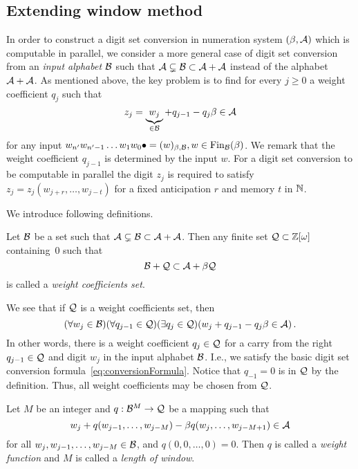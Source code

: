\begin{upravit}
\section{Extending window method}
\label{sec:methodDescription}
In order to construct a digit set conversion in numeration system $(\beta,\mathcal{A})$ which is computable in parallel, we consider a more general case of digit set conversion from an \emph{input alphabet} $\mathcal{B}$ such that $\mathcal{A} \subsetneq \mathcal{B} \subset \mathcal{A} +\mathcal{A}$ instead of the alphabet $\mathcal{A}+\mathcal{A}$.
As mentioned above, the key problem is to find for every $j\geq 0$ a weight coefficient $q_j$ such that 
    $$
        z_j=\underbrace{w_j}_{\in \mathcal{B}} + q_{j-1} - q_j \beta \in \mathcal{A} 
    $$  
    for any input $w_{n'}w_{n'-1}\dots w_1 w_0 \bullet=(w)_{\beta,\mathcal{B}}, w\in \text{Fin}_{\mathcal{B}}(\beta)$. We remark that the weight coefficient $q_{j-1}$ is determined by the input $w$. For a digit set conversion to be computable in parallel the digit $z_j$ is required to satisfy $z_j=z_j(w_{j+r},\dots,w_{j-t})$ for a fixed anticipation $r$ and memory $t$ in $\mathbb{N}$.
    
    We introduce following definitions. 
    \begin{defn}
    \label{def:weightCoefficientsSet}
        Let $\mathcal{B}$ be a set such that $\mathcal{A} \subsetneq \mathcal{B} \subset \mathcal{A} +\mathcal{A}$. Then any finite set $\mathcal{Q}\subset\mathbb{Z}[\omega]$ containing~0 such that 
        $$
            \mathcal{B} + \mathcal{Q} \subset \mathcal{A} + \beta \mathcal{Q}
        $$  
        is called a \emph{weight coefficients set}.
    \end{defn}
    We see that if $\mathcal{Q}$ is a weight coefficients set, then
        $$
        (\forall w_j \in \mathcal{B})(\forall q_{j-1}\in\mathcal{Q})(\exists q_j \in \mathcal{Q} )(w_j + q_{j-1} - q_j \beta \in \mathcal{A} )\,.
        $$
    In other words, there is a weight coefficient $q_j \in \mathcal{Q}$ for a carry from the right $q_{j-1}\in \mathcal{Q}$ and  digit $w_j$ in the input alphabet $\mathcal{B}$. I.e., we  satisfy the basic digit set conversion formula~\eqref{eq:conversionFormula}. Notice that $q_{-1}=0$ is in $\mathcal{Q}$ by the definition. Thus, all weight coefficients may be chosen from $\mathcal{Q}$.
    \begin{defn}
    Let $M$ be an integer and $q:\mathcal{B}^{M} \rightarrow \mathcal{Q}$ be a mapping such that 
    $$
    w_j+ q(w_{j-1}, \dots, w_{j-M}) - \beta q(w_j, \dots, w_{j-M+1}) \in \mathcal{A}
    $$
    for all $w_j,w_{j-1}, \dots, w_{j-M} \in \mathcal{B}$, and $q(0,0,\dots,0)=0$. Then $q$ is called a \emph{weight function} and $M$ is called a \emph{length of window}.    
    \end{defn}


\end{upravit}
